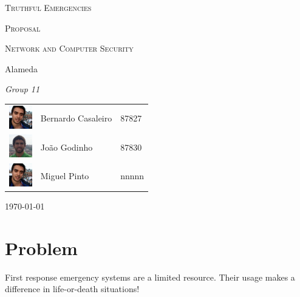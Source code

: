 \documentclass[a4paper,titlepage,11pt]{article}
\begin{document}
\begin{titlepage}
  \begin{center}
    {\scshape \huge Truthful Emergencies \par}
    \vspace{1cm}

    {\scshape \LARGE Proposal \par}
    \vspace{1.5cm}

    {\scshape \Large Network and Computer Security \par}
    \vspace{0.5cm}

    {\Large Alameda \par}
    \vfill

    {\itshape \Large Group 11 \par}
    \vfill

    \begin{tabular}{l l l}
      \includegraphics[width=10mm, height=10mm]{img/bernardo.jpeg} & Bernardo Casaleiro & 87827\\
      \includegraphics[width=10mm, height=10mm]{img/joao.jpeg} & João Godinho & 87830\\                       %
      \includegraphics[width=10mm, height=10mm]{img/bernardo.jpeg} & Miguel Pinto & nnnnn\\                       %
    \end{tabular}
    \vfill

    {\large \today\par}
  \end{center}
\end{titlepage}

\section{Problem}
First response emergency systems are a limited resource. Their usage makes a difference in life-or-death situations!
\end{document}
